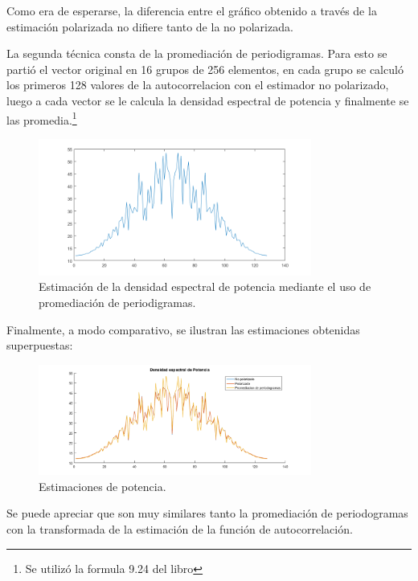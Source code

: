 
Como era de esperarse, la diferencia entre el gráfico obtenido a través de la estimación polarizada no difiere tanto de la no polarizada.

La segunda técnica consta de la promediación de periodigramas. Para esto se partió el vector original en 16 grupos de 256 elementos, en cada grupo se calculó los primeros 128 valores de la autocorrelacion con el estimador no polarizado, luego a cada vector se le calcula la densidad espectral de potencia y finalmente se las promedia.\footnote{Se utilizó la formula 9.24 del libro}
\begin{figure}[H]
\centering
	\includegraphics[width=0.8\textwidth, trim = {0 0 0 0.725cm},clip]{./ImagenesEjercicio2/period-calc.png}
	\caption{Estimación de la densidad espectral de potencia mediante el uso de promediación de periodigramas.}
	\label{fig:fft-calc}
\end{figure}



Finalmente, a modo comparativo, se ilustran las estimaciones obtenidas superpuestas:
\begin{figure}[H]
\centering
	\includegraphics[width=0.8\textwidth, trim = {0 0 0 0.725cm},clip]{./ImagenesEjercicio2/fft2.png}
	\caption{Estimaciones de potencia.}
	\label{fig:fft2}
\end{figure}
Se puede apreciar que son muy similares tanto la promediación de periodogramas con la transformada de la estimación de la función de autocorrelación.
%

